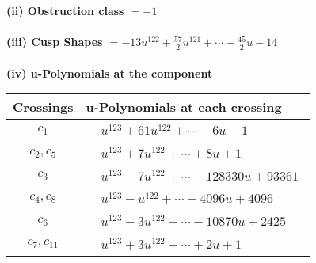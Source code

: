 \documentclass[1p]{elsarticle_modified}
\theoremstyle{definition}
\begin{document}
\flushleft \textbf{(ii) Obstruction class $= -1$}\\~\\
\flushleft \textbf{(iii) Cusp Shapes $= -13 u^{122}+\frac{57}{2} u^{121}+\cdots+\frac{45}{2} u-14$}\\~\\
\newpage\renewcommand{\arraystretch}{1}
\flushleft \textbf{(iv) u-Polynomials at the component}\newline \\
\begin{tabular}{m{50pt}|m{274pt}}
Crossings & \hspace{64pt}u-Polynomials at each crossing \\
\hline $$\begin{aligned}c_{1}\end{aligned}$$&$\begin{aligned}
&u^{123}+61 u^{122}+\cdots-6 u-1
\end{aligned}$\\
\hline $$\begin{aligned}c_{2},c_{5}\end{aligned}$$&$\begin{aligned}
&u^{123}+7 u^{122}+\cdots+8 u+1
\end{aligned}$\\
\hline $$\begin{aligned}c_{3}\end{aligned}$$&$\begin{aligned}
&u^{123}-7 u^{122}+\cdots-128330 u+93361
\end{aligned}$\\
\hline $$\begin{aligned}c_{4},c_{8}\end{aligned}$$&$\begin{aligned}
&u^{123}- u^{122}+\cdots+4096 u+4096
\end{aligned}$\\
\hline $$\begin{aligned}c_{6}\end{aligned}$$&$\begin{aligned}
&u^{123}-3 u^{122}+\cdots-10870 u+2425
\end{aligned}$\\
\hline $$\begin{aligned}c_{7},c_{11}\end{aligned}$$&$\begin{aligned}
&u^{123}+3 u^{122}+\cdots+2 u+1
\end{aligned}$\\

\end{tabular}
\end{document}
